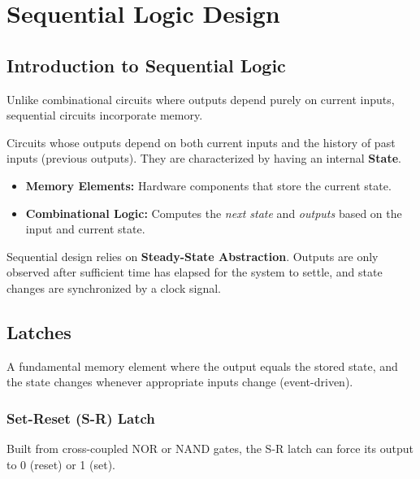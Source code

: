 \chapter{Sequential Logic Design}

\section{Introduction to Sequential Logic}

Unlike combinational circuits where outputs depend purely on current inputs, sequential circuits incorporate memory.

\begin{definition}
Circuits whose outputs depend on both current inputs and the history of past inputs (previous outputs). They are characterized by having an internal \textbf{State}.
\end{definition}

\begin{itemize}
    \item \textbf{Memory Elements:} Hardware components that store the current state.
    \item \textbf{Combinational Logic:} Computes the \textit{next state} and \textit{outputs} based on the input and current state.
\end{itemize}

\begin{remark}
Sequential design relies on \textbf{Steady-State Abstraction}. Outputs are only observed after sufficient time has elapsed for the system to settle, and state changes are synchronized by a clock signal.
\end{remark}

\section{Latches}

\begin{definition}[Latch]
A fundamental memory element where the output equals the stored state, and the state changes whenever appropriate inputs change (event-driven).
\end{definition}

\subsection{Set-Reset (S-R) Latch}

Built from cross-coupled NOR or NAND gates, the S-R latch can force its output to 0 (reset) or 1 (set).

